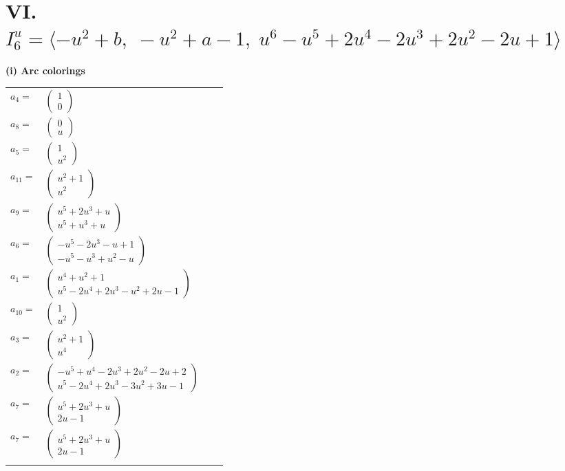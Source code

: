\documentclass[1p]{elsarticle_modified}
\theoremstyle{definition}
\begin{document}
\centering \section*{VI. $I^u_{6}= \langle - u^2+b,\;- u^2+a-1,\;u^6- u^5+2 u^4-2 u^3+2 u^2-2 u+1 \rangle$}
\flushleft \textbf{(i) Arc colorings}\\
\begin{tabular}{m{7pt} m{180pt} m{7pt} m{180pt} }
\flushright $a_{4}=$&$\begin{pmatrix}1\\0\end{pmatrix}$ \\
\flushright $a_{8}=$&$\begin{pmatrix}0\\u\end{pmatrix}$ \\
\flushright $a_{5}=$&$\begin{pmatrix}1\\u^2\end{pmatrix}$ \\
\flushright $a_{11}=$&$\begin{pmatrix}u^2+1\\u^2\end{pmatrix}$ \\
\flushright $a_{9}=$&$\begin{pmatrix}u^5+2 u^3+u\\u^5+u^3+u\end{pmatrix}$ \\
\flushright $a_{6}=$&$\begin{pmatrix}- u^5-2 u^3- u+1\\- u^5- u^3+u^2- u\end{pmatrix}$ \\
\flushright $a_{1}=$&$\begin{pmatrix}u^4+u^2+1\\u^5-2 u^4+2 u^3- u^2+2 u-1\end{pmatrix}$ \\
\flushright $a_{10}=$&$\begin{pmatrix}1\\u^2\end{pmatrix}$ \\
\flushright $a_{3}=$&$\begin{pmatrix}u^2+1\\u^4\end{pmatrix}$ \\
\flushright $a_{2}=$&$\begin{pmatrix}- u^5+u^4-2 u^3+2 u^2-2 u+2\\u^5-2 u^4+2 u^3-3 u^2+3 u-1\end{pmatrix}$ \\
\flushright $a_{7}=$&$\begin{pmatrix}u^5+2 u^3+u\\2 u-1\end{pmatrix}$\\ \flushright $a_{7}=$&$\begin{pmatrix}u^5+2 u^3+u\\2 u-1\end{pmatrix}$\\&\end{tabular}
\end{document}

